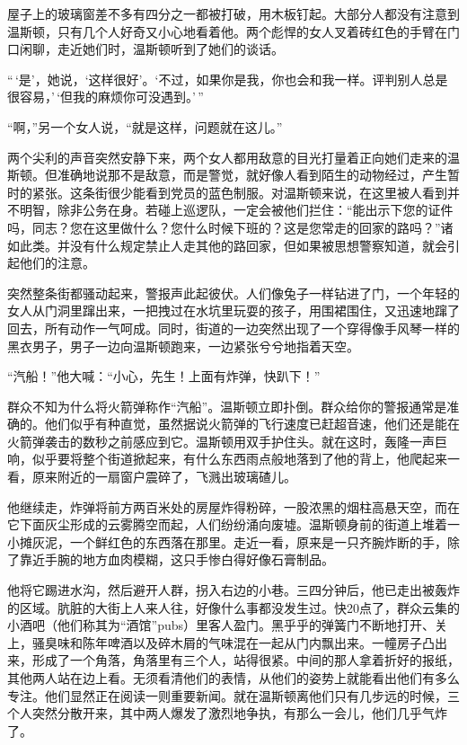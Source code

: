 屋子上的玻璃窗差不多有四分之一都被打破，用木板钉起。大部分人都没有注意到温斯顿，只有几个人好奇又小心地看着他。两个彪悍的女人叉着砖红色的手臂在门口闲聊，走近她们时，温斯顿听到了她们的谈话。

``\,`是'，她说，`这样很好'。`不过，如果你是我，你也会和我一样。评判别人总是很容易，'\,`但我的麻烦你可没遇到。'\,''

``啊，''另一个女人说，``就是这样，问题就在这儿。''

两个尖利的声音突然安静下来，两个女人都用敌意的目光打量着正向她们走来的温斯顿。但准确地说那不是敌意，而是警觉，就好像人看到陌生的动物经过，产生暂时的紧张。这条街很少能看到党员的蓝色制服。对温斯顿来说，在这里被人看到并不明智，除非公务在身。若碰上巡逻队，一定会被他们拦住：``能出示下您的证件吗，同志？您在这里做什么？您什么时候下班的？这是您常走的回家的路吗？''诸如此类。并没有什么规定禁止人走其他的路回家，但如果被思想警察知道，就会引起他们的注意。

突然整条街都骚动起来，警报声此起彼伏。人们像兔子一样钻进了门，一个年轻的女人从门洞里蹿出来，一把拽过在水坑里玩耍的孩子，用围裙围住，又迅速地蹿了回去，所有动作一气呵成。同时，街道的一边突然出现了一个穿得像手风琴一样的黑衣男子，男子一边向温斯顿跑来，一边紧张兮兮地指着天空。

``汽船！''他大喊：``小心，先生！上面有炸弹，快趴下！''

群众不知为什么将火箭弹称作``汽船''。温斯顿立即扑倒。群众给你的警报通常是准确的。他们似乎有种直觉，虽然据说火箭弹的飞行速度已赶超音速，他们还是能在火箭弹袭击的数秒之前感应到它。温斯顿用双手护住头。就在这时，轰隆一声巨响，似乎要将整个街道掀起来，有什么东西雨点般地落到了他的背上，他爬起来一看，原来附近的一扇窗户震碎了，飞溅出玻璃碴儿。

他继续走，炸弹将前方两百米处的房屋炸得粉碎，一股浓黑的烟柱高悬天空，而在它下面灰尘形成的云雾腾空而起，人们纷纷涌向废墟。温斯顿身前的街道上堆着一小摊灰泥，一个鲜红色的东西落在那里。走近一看，原来是一只齐腕炸断的手，除了靠近手腕的地方血肉模糊，这只手惨白得好像石膏制品。

他将它踢进水沟，然后避开人群，拐入右边的小巷。三四分钟后，他已走出被轰炸的区域。肮脏的大街上人来人往，好像什么事都没发生过。快20点了，群众云集的小酒吧（他们称其为``酒馆''pubs）里客人盈门。黑乎乎的弹簧门不断地打开、关上，骚臭味和陈年啤酒以及碎木屑的气味混在一起从门内飘出来。一幢房子凸出来，形成了一个角落，角落里有三个人，站得很紧。中间的那人拿着折好的报纸，其他两人站在边上看。无须看清他们的表情，从他们的姿势上就能看出他们有多么专注。他们显然正在阅读一则重要新闻。就在温斯顿离他们只有几步远的时候，三个人突然分散开来，其中两人爆发了激烈地争执，有那么一会儿，他们几乎气炸了。

